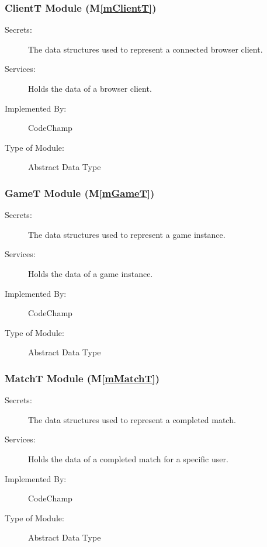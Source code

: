 \documentclass[12pt, titlepage]{article}
\newcommand{\mref}[1]{M\ref{#1}}
\begin{document}

\subsubsection{ ClientT Module (\mref{mClientT})}

\begin{description}
\item[Secrets:] The data structures used to represent a connected browser client.
\item[Services:] Holds the data of a browser client.
\item[Implemented By:] CodeChamp
\item[Type of Module:] Abstract Data Type
\end{description}

\subsubsection{ GameT Module (\mref{mGameT})}

\begin{description}
\item[Secrets:] The data structures used to represent a game instance.
\item[Services:] Holds the data of a game instance.
\item[Implemented By:] CodeChamp
\item[Type of Module:] Abstract Data Type
\end{description}

\subsubsection{ MatchT Module (\mref{mMatchT})}

\begin{description}
\item[Secrets:] The data structures used to represent a completed match.
\item[Services:] Holds the data of a completed match for a specific user.
\item[Implemented By:] CodeChamp
\item[Type of Module:] Abstract Data Type
\end{description}
\end{document}
